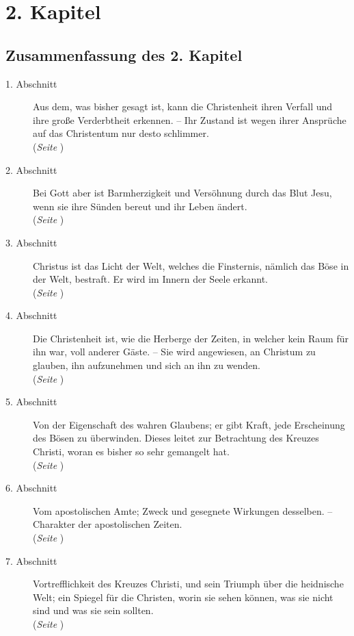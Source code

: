 
\chapter{2. Kapitel}  \label{kap2}


\section{Zusammenfassung des 2. Kapitel}

\begin{description}
\item[1. Abschnitt] Aus dem, was bisher gesagt ist, kann die Christenheit ihren
Verfall und ihre große Verderbtheit erkennen. -- Ihr Zustand ist wegen ihrer
Ansprüche auf das Christentum
 nur desto schlimmer.
\\ (\textit{Seite \pageref{kap2_ab1}})
\item[2. Abschnitt] Bei Gott aber ist Barmherzigkeit und Versöhnung durch das
Blut Jesu, wenn sie ihre Sünden bereut und ihr Leben ändert.
\\(\textit{Seite \pageref{kap2_ab2}})
\item[3. Abschnitt] Christus ist das Licht der Welt, welches die Finsternis,
nämlich das Böse in der Welt, bestraft. Er wird im Innern der Seele erkannt.
\\(\textit{Seite \pageref{kap2_ab3}})
\item[4. Abschnitt] Die Christenheit ist, wie die Herberge der Zeiten, in
welcher kein Raum für ihn war, voll anderer Gäste. -- Sie wird angewiesen, an
Christum zu glauben, ihn aufzunehmen und sich an ihn zu wenden.
\\(\textit{Seite \pageref{kap2_ab4}})
\item[5. Abschnitt] Von der Eigenschaft des wahren Glaubens; er gibt Kraft,
jede Erscheinung des Bösen zu überwinden. Dieses leitet%
 zur Betrachtung des
Kreuzes Christi, woran es bisher so sehr gemangelt hat.
\\(\textit{Seite \pageref{kap2_ab5}})
\item[6. Abschnitt] Vom apostolischen Amte; Zweck und gesegnete Wirkungen
desselben. -- Charakter der apostolischen Zeiten.
\\(\textit{Seite \pageref{kap2_ab6}})
\item[7. Abschnitt] Vortrefflichkeit des Kreuzes Christi, und sein Triumph über
die heidnische Welt; ein Spiegel für die Christen, worin sie sehen können, was
sie nicht sind und was sie sein sollten.
\\(\textit{Seite \pageref{kap2_ab7}})

\end{description}
